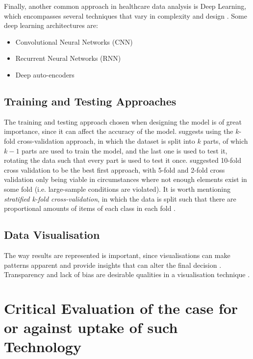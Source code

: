 \documentclass[a4paper,12pt]{article}
\begin{document}
Finally, another common approach in healthcare data analysis is Deep Learning, which encompasses several techniques that vary in complexity and design \parencite{Ibrahim2021}. Some deep learning architectures are:

\begin{itemize}
 \item Convolutional Neural Networks (CNN)
 \item Recurrent Neural Networks (RNN)
 \item Deep auto-encoders
\end{itemize}


\subsection{Training and Testing Approaches}

The training and testing approach chosen when designing the model is of great importance, since it can affect the accuracy of the model.
\textcite[39]{Consoli2019} suggests using the \(k\)-fold cross-validation approach, in which the dataset is split into \(k\) parts, of which \(k-1\) parts are used to train the model, and the last one is used to test it, rotating the data such that every part is used to test it once. \textcite{Wong2020} suggested 10-fold cross validation to be the best first approach, with 5-fold and 2-fold cross validation only being viable in circumstances where not enough elements exist in some fold (i.e. large-sample conditions are violated). It is worth mentioning \textit{stratified k-fold cross-validation}, in which the data is split such that there are proportional amounts of items of each class in each fold \parencite{Mueller2017}.

\subsection{Data Visualisation}

The way results are represented is important, since visualisations can make patterns apparent and provide insights that can alter the final decision \parencite{Hendriks2019}.
Transparency and lack of bias are desirable qualities in a visualisation technique \parencite{Hendriks2019}.

\section{Critical Evaluation of the case for or against uptake of such Technology}
\end{document}
